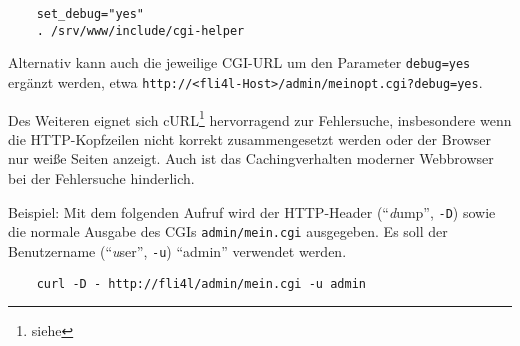 \begin{example}
\begin{verbatim}
    set_debug="yes"
    . /srv/www/include/cgi-helper
\end{verbatim}
\end{example}

Alternativ kann auch die jeweilige CGI-URL um den Parameter \texttt{debug=yes}
ergänzt werden, etwa \texttt{http://<fli4l-Host>/admin/meinopt.cgi?debug=yes}.

Des Weiteren eignet sich cURL\footnote{siehe
} hervorragend zur Fehlersuche,
insbesondere wenn die HTTP-Kopfzeilen nicht korrekt zusammengesetzt werden oder
der Browser nur weiße Seiten anzeigt. Auch ist das Cachingverhalten moderner
Webbrowser bei der Fehlersuche hinderlich.

Beispiel: Mit dem folgenden Aufruf wird der HTTP-Header ("`\emph{d}ump"',
\texttt{-D}) sowie die normale Ausgabe des CGIs \texttt{admin/mein.cgi}
ausgegeben. Es soll der Benutzername ("`\emph{u}ser"', \texttt{-u}) "`admin"'
verwendet werden.

\begin{example}
\begin{verbatim}
    curl -D - http://fli4l/admin/mein.cgi -u admin
\end{verbatim}
\end{example}
